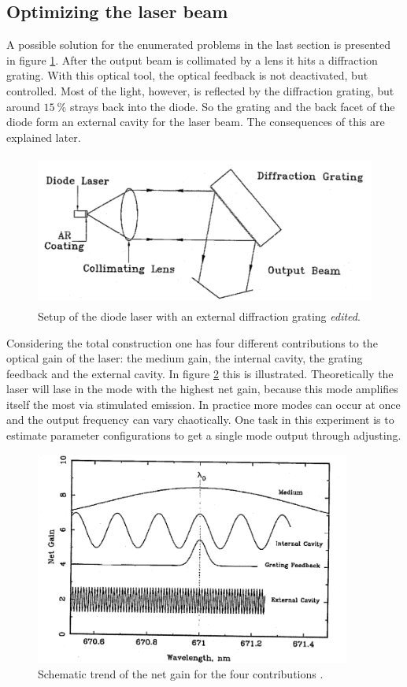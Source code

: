 \subsection{Optimizing the laser beam}

A possible solution for the enumerated problems in the last section is presented in figure \ref{fig:diffraction}.
After the output beam is collimated by a lens it hits a diffraction grating. With this optical tool, the optical
feedback is not deactivated, but controlled. Most of the light, however, is reflected by the diffraction grating,
but around $\SI{15}{\percent}$ strays back into the diode. So the grating and the back facet of the diode form
an external cavity for the laser beam. The consequences of this are explained later.

\begin{figure}
  \centering
  \includegraphics[height=5cm]{Ordnername/diffraction_edit.pdf}
  \caption{Setup of the diode laser with an external diffraction grating \cite{manual} \textit{edited}.}
  \label{fig:diffraction}
\end{figure}

Considering the total construction one has four different contributions to the optical gain of the laser:
the medium gain, the internal cavity, the grating feedback and the external cavity.
In figure \ref{fig:optgain} this is illustrated. Theoretically the laser will lase in the mode with the
highest net gain, because this mode amplifies itself the most via stimulated emission. In practice more
modes can occur at once and the output frequency can vary chaotically. One task in this experiment is to
estimate parameter configurations to get a single mode output through adjusting.

\begin{figure}
  \centering
  \includegraphics[height=7cm]{Ordnername/optgain.png}
  \caption{Schematic trend of the net gain for the four contributions \cite{manual}.}
  \label{fig:optgain}
\end{figure}

